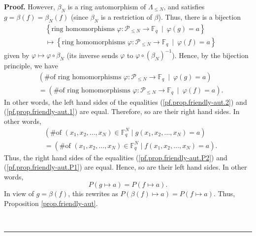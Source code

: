 \documentclass[numbers=enddot,12pt,final,onecolumn,notitlepage]{scrartcl}%
\theoremstyle{definition}
\newenvironment{proof}[1][Proof]{\noindent\textbf{#1.} }{\ \rule{0.5em}{0.5em}}
\renewcommand{\leq}{\leqslant}
\theoremstyle{plainsl}
\begin{document}
\begin{proof}
However, $\beta_{N}$ is a ring automorphism of $\Lambda_{\leq N}$, and
satisfies $g=\beta\left(  f\right)  =\beta_{N}\left(  f\right)  $ (since
$\beta_{N}$ is a restriction of $\beta$). Thus, there is a bijection%
\begin{align*}
& \left\{  \text{ring homomorphisms }\varphi:\mathcal{P}_{\leq N}%
\rightarrow\mathbb{F}_{q}\ \mid\ \varphi\left(  g\right)  =a\right\}  \\
& \mapsto\left\{  \text{ring homomorphisms }\varphi:\mathcal{P}_{\leq
N}\rightarrow\mathbb{F}_{q}\ \mid\ \varphi\left(  f\right)  =a\right\}
\end{align*}
given by $\varphi\mapsto\varphi\circ\beta_{N}$ (its inverse sends $\varphi$ to
$\varphi\circ\left(  \beta_{N}\right)  ^{-1}$). Hence, by the bijection
principle, we have%
\begin{align*}
& \left(  \text{\# of ring homomorphisms }\varphi:\mathcal{P}_{\leq
N}\rightarrow\mathbb{F}_{q}\ \mid\ \varphi\left(  g\right)  =a\right)  \\
& =\left(  \text{\# of ring homomorphisms }\varphi:\mathcal{P}_{\leq
N}\rightarrow\mathbb{F}_{q}\ \mid\ \varphi\left(  f\right)  =a\right)  .
\end{align*}
In other words, the left hand sides of the equalities
(\ref{pf.prop.friendly-aut.2}) and (\ref{pf.prop.friendly-aut.1}) are equal.
Therefore, so are their right hand sides. In other words,%
\begin{align*}
& \left(  \text{\# of }\left(  x_{1},x_{2},\ldots,x_{N}\right)  \in
\mathbb{F}_{q}^{N}\mid g\left(  x_{1},x_{2},\ldots,x_{N}\right)  =a\right)
\\
& =\left(  \text{\# of }\left(  x_{1},x_{2},\ldots,x_{N}\right)  \in
\mathbb{F}_{q}^{N}\mid f\left(  x_{1},x_{2},\ldots,x_{N}\right)  =a\right)  .
\end{align*}
Thus, the right hand sides of the equalities (\ref{pf.prop.friendly-aut.P2})
and (\ref{pf.prop.friendly-aut.P1}) are equal. Hence, so are their left hand
sides. In other words,%
\[
P\left(  g\mapsto a\right)  =P\left(  f\mapsto a\right)  .
\]
In view of $g=\beta\left(  f\right)  $, this rewrites as $P\left(
\beta\left(  f\right)  \mapsto a\right)  =P\left(  f\mapsto a\right)  $. Thus,
Proposition \ref{prop.friendly-aut}.


\end{proof}
\end{document}
